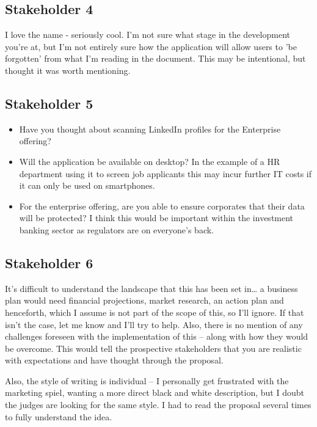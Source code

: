   \subsection{Stakeholder 4}

    I love the name - seriously cool. I'm not sure what stage in the development you're at, but I'm not entirely sure how the application will allow users to 'be forgotten' from what I'm reading in the document. This may be intentional, but thought it was worth mentioning.

  \subsection{Stakeholder 5}

    \begin{itemize}
      \item Have you thought about scanning LinkedIn profiles for the Enterprise offering?
      \item Will the application be available on desktop? In the example of a HR department using it to screen job applicants this may incur further IT costs if it can only be used on smartphones.
      \item For the enterprise offering, are you able to ensure corporates that their data will be protected? I think this would be important within the investment banking sector as regulators are on everyone's back.
    \end{itemize}

  \subsection{Stakeholder 6}

    It's difficult to understand the landscape that this has been set in… a business plan would need financial projections, market research, an action plan and henceforth, which I assume is not part of the scope of this, so I'll ignore. If that isn't the case, let me know and I'll try to help. Also, there is no mention of any challenges foreseen with the implementation of this – along with how they would be overcome.  This would tell the prospective stakeholders that you are realistic with expectations and have thought through the proposal.

    Also, the style of writing is individual – I personally get frustrated with the marketing spiel, wanting a more direct black and white description, but I doubt the judges are looking for the same style.  I had to read the proposal several times to fully understand the idea.

